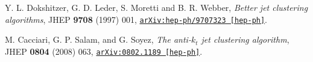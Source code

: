 \begin{comment}
\begin{thebibliography}{12}

\bibitem{conf5}
ATLAS Collaboration, \emph{Observation of a new particle in the search of the Standard Model Higgs boson with the ATLAS deteector at the LHC}, Phys.Lett. \textbf{B716} (2012) 1--29, \href{http://arxiv.org/abs/1207.7214}{\texttt{arXiv:1207.7214 [hep-ex]}}.

\bibitem{conf6}
CMS Collaboration, \emph{Observation of a new boson at a mass of 125 \GeV\ with the CMS experiment at the LHC}, Phys.Lett. \textbf{B716} (2012) 30--61, \href{http://arxiv.org/abs/1207.7235}{\texttt{arXiv:1207.7235 [hep-ex]}}.

\bibitem{newresult}
ATLAS Collaboration, \emph{Search for the bb decay of the Standard Model Higgs boson inassociated ($W/Z$)$H$ production with the ATLAS detector}, \href{http://arxiv.org/abs/1409.6212}{\texttt{arXiv:1409.6212 [hep-ph]}} (2014).

\bibitem{conf}
ATLAS Collaboration, \emph{Search for the $b\bar{b}$ decay of the Standard Model Higgs boson in associated ($W/Z$)$H$ production with the ATLAS detector}, ATLAS-CONF-2013-079 (2013), \url{https://cdsweb.cern.ch/record/1563235}.

\bibitem{teljet}
Y. Chien, \emph{Telescoping Jets: Multiple Event Interpretations with Multiple $R$'s}, \href{http://arxiv.org/abs/1304.5240}{\texttt{arXiv:1304.5240 [hep-ph]}} (2013).

\bibitem{qjet}
S. D. Ellis, A. Hornig, T. S. Roy, D. Krohn and M. D. Schwartz, \emph{Qjets: A Non-Deterministic Approach to Tree-Based Jet Substructure}, Phys. Rev. Lett. \textbf{108}, 182003 (2012) \href{http://arxiv.org/abs/1201.1914}{\texttt{arXiv:1201.1914 [hep-ph]}}.

\bibitem{kt}
S. Catani, Y. L. Dokshitzer, M. H. Seymour, and B. R. Webber, \emph{Longitudinally invariant $K\left(t\right)$ clustering algorithms for hadron hadron colliders}, Nucl. Phys. B \textbf{406}, 187 (1993).
\end{comment}

Y. L. Dokshitzer, G. D. Leder, S. Moretti and B. R. Webber, \emph{Better jet clustering algorithms}, JHEP \textbf{9708} (1997) 001, \href{http://arxiv.org/abs/hep-ph/9707323}{\texttt{arXiv:hep-ph/9707323 [hep-ph]}}.

M. Cacciari, G. P. Salam, and G. Soyez, \emph{The anti-$k_t$ jet clustering algorithm}, JHEP \textbf{0804} (2008) 063, \href{http://arxiv.org/abs/0802.1189}{\texttt{arXiv:0802.1189 [hep-ph]}}.

